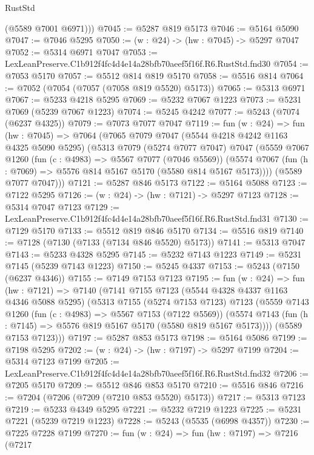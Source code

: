 \begin{lexlean}{RustStd}
\begin{coremodule}
        (@5589 @7001 @6971)))
@7045 := @5287 @819 @5173
@7046 := @5164 @5090
@7047 := @7046 @5295
@7050 := (w : @24) -> (hw : @7045) -> @5297 @7047
@7052 := @5314 @6971 @7047
@7053 := LexLeanPreserve.C1b912f4fc4d4e14a28bfb70aeef5f16f.R6.RustStd.fnd30
@7054 := @7053 @5170
@7057 := @5512 @814 @819 @5170
@7058 := @5516 @814
@7064 := @7052 (@7054 (@7057 (@7058 @819 @5520) @5173))
@7065 := @5313 @6971
@7067 := @5233 @4218 @5295
@7069 := @5232 @7067 @1223
@7073 := @5231 @7069 (@5239 @7067 @1223)
@7074 := @5245 @4242
@7077 := @5243 (@7074 (@6237 @4325))
@7079 := @7073 @7077 @7047
@7119 := fun (w : @24) =>
  fun (hw : @7045) =>
  @7064
    (@7065
      @7079
      @7047
      (@5544 @4218 @4242 @1163 @4325 @5090 @5295)
      (@5313
        @7079
        (@5274 @7077 @7047)
        @7047
        (@5559
          @7067
          @1260
          (fun (c : @4983) => @5567 @7077 (@7046 @5569))
          (@5574 @7067 (fun (h : @7069) => @5576 @814 @5167 @5170 (@5580 @814 @5167 @5173))))
        (@5589 @7077 @7047)))
@7121 := @5287 @846 @5173
@7122 := @5164 @5088
@7123 := @7122 @5295
@7126 := (w : @24) -> (hw : @7121) -> @5297 @7123
@7128 := @5314 @7047 @7123
@7129 := LexLeanPreserve.C1b912f4fc4d4e14a28bfb70aeef5f16f.R6.RustStd.fnd31
@7130 := @7129 @5170
@7133 := @5512 @819 @846 @5170
@7134 := @5516 @819
@7140 := @7128 (@7130 (@7133 (@7134 @846 @5520) @5173))
@7141 := @5313 @7047
@7143 := @5233 @4328 @5295
@7145 := @5232 @7143 @1223
@7149 := @5231 @7145 (@5239 @7143 @1223)
@7150 := @5245 @4337
@7153 := @5243 (@7150 (@6237 @4346))
@7155 := @7149 @7153 @7123
@7195 := fun (w : @24) =>
  fun (hw : @7121) =>
  @7140
    (@7141
      @7155
      @7123
      (@5544 @4328 @4337 @1163 @4346 @5088 @5295)
      (@5313
        @7155
        (@5274 @7153 @7123)
        @7123
        (@5559
          @7143
          @1260
          (fun (c : @4983) => @5567 @7153 (@7122 @5569))
          (@5574 @7143 (fun (h : @7145) => @5576 @819 @5167 @5170 (@5580 @819 @5167 @5173))))
        (@5589 @7153 @7123)))
@7197 := @5287 @853 @5173
@7198 := @5164 @5086
@7199 := @7198 @5295
@7202 := (w : @24) -> (hw : @7197) -> @5297 @7199
@7204 := @5314 @7123 @7199
@7205 := LexLeanPreserve.C1b912f4fc4d4e14a28bfb70aeef5f16f.R6.RustStd.fnd32
@7206 := @7205 @5170
@7209 := @5512 @846 @853 @5170
@7210 := @5516 @846
@7216 := @7204 (@7206 (@7209 (@7210 @853 @5520) @5173))
@7217 := @5313 @7123
@7219 := @5233 @4349 @5295
@7221 := @5232 @7219 @1223
@7225 := @5231 @7221 (@5239 @7219 @1223)
@7228 := @5243 (@5535 (@6998 @4357))
@7230 := @7225 @7228 @7199
@7270 := fun (w : @24) =>
  fun (hw : @7197) =>
  @7216
    (@7217

\end{coremodule}
\end{lexlean}
